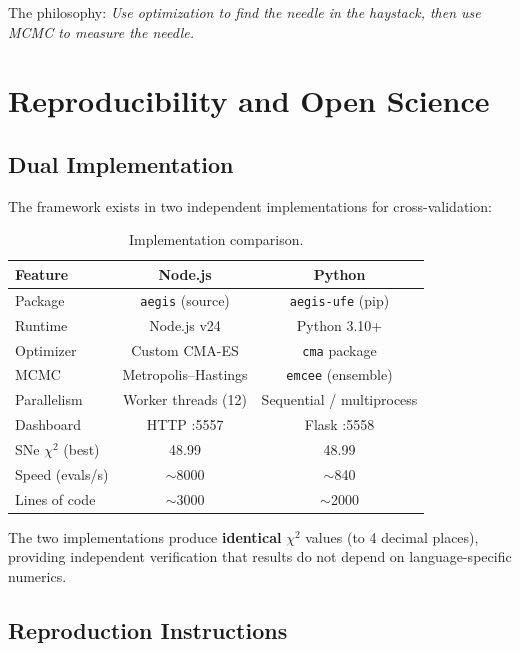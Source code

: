 \documentclass[twocolumn,showpacs,preprintnumbers,amsmath,amssymb,prl]{revtex4-2}
\begin{document}
The philosophy: \textit{Use optimization to find the needle in the haystack, then use MCMC to measure the needle.}

\section{Reproducibility and Open Science}

\subsection{Dual Implementation}

The framework exists in two independent implementations for cross-validation:

\begin{table}[h]
\caption{Implementation comparison.}
\begin{ruledtabular}
\begin{tabular}{lcc}
Feature & Node.js & Python \\
\hline
Package & \texttt{aegis} (source) & \texttt{aegis-ufe} (pip) \\
Runtime & Node.js v24 & Python 3.10+ \\
Optimizer & Custom CMA-ES & \texttt{cma} package \\
MCMC & Metropolis--Hastings & \texttt{emcee} (ensemble) \\
Parallelism & Worker threads (12) & Sequential / multiprocess \\
Dashboard & HTTP :5557 & Flask :5558 \\
SNe $\chi^2$ (best) & 48.99 & 48.99 \\
Speed (evals/s) & $\sim$8000 & $\sim$840 \\
Lines of code & $\sim$3000 & $\sim$2000 \\
\end{tabular}
\end{ruledtabular}
\end{table}

The two implementations produce \textbf{identical} $\chi^2$ values (to 4 decimal places), providing independent verification that results do not depend on language-specific numerics.

\subsection{Reproduction Instructions}
\end{document}
